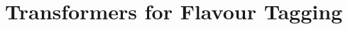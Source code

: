 \documentclass[
	11pt,
	english,
	oneside,
	singlespacing,
	parskip,
	headsepline,
	consistentlayout,
]{DoctoralThesis}
\author{Matthew \textsc{Leigh}}
\begin{document}
\frontmatter
\pagestyle{plain}

% 
% 
% 
% 


\mainmatter
\pagestyle{thesis}

% 
% 
% 
\part{Transformers for Flavour Tagging}

% 
% 
% 
% 
% 
% 

\appendix

% 

\printbibliography[heading=bibintoc]
\end{document}

